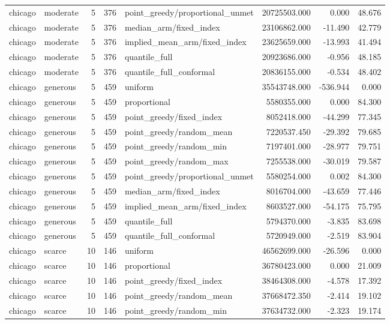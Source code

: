 \begin{tabular}{llrrlrrr}
chicago & moderate & 5 & 376 & point\_greedy/proportional\_unmet & 20725503.000 & 0.000 & 48.676 \\
chicago & moderate & 5 & 376 & median\_arm/fixed\_index & 23106862.000 & -11.490 & 42.779 \\
chicago & moderate & 5 & 376 & implied\_mean\_arm/fixed\_index & 23625659.000 & -13.993 & 41.494 \\
chicago & moderate & 5 & 376 & quantile\_full & 20923686.000 & -0.956 & 48.185 \\
chicago & moderate & 5 & 376 & quantile\_full\_conformal & 20836155.000 & -0.534 & 48.402 \\
chicago & generous & 5 & 459 & uniform & 35543748.000 & -536.944 & 0.000 \\
chicago & generous & 5 & 459 & proportional & 5580355.000 & 0.000 & 84.300 \\
chicago & generous & 5 & 459 & point\_greedy/fixed\_index & 8052418.000 & -44.299 & 77.345 \\
chicago & generous & 5 & 459 & point\_greedy/random\_mean & 7220537.450 & -29.392 & 79.685 \\
chicago & generous & 5 & 459 & point\_greedy/random\_min & 7197401.000 & -28.977 & 79.751 \\
chicago & generous & 5 & 459 & point\_greedy/random\_max & 7255538.000 & -30.019 & 79.587 \\
chicago & generous & 5 & 459 & point\_greedy/proportional\_unmet & 5580254.000 & 0.002 & 84.300 \\
chicago & generous & 5 & 459 & median\_arm/fixed\_index & 8016704.000 & -43.659 & 77.446 \\
chicago & generous & 5 & 459 & implied\_mean\_arm/fixed\_index & 8603527.000 & -54.175 & 75.795 \\
chicago & generous & 5 & 459 & quantile\_full & 5794370.000 & -3.835 & 83.698 \\
chicago & generous & 5 & 459 & quantile\_full\_conformal & 5720949.000 & -2.519 & 83.904 \\
chicago & scarce & 10 & 146 & uniform & 46562699.000 & -26.596 & 0.000 \\
chicago & scarce & 10 & 146 & proportional & 36780423.000 & 0.000 & 21.009 \\
chicago & scarce & 10 & 146 & point\_greedy/fixed\_index & 38464308.000 & -4.578 & 17.392 \\
chicago & scarce & 10 & 146 & point\_greedy/random\_mean & 37668472.350 & -2.414 & 19.102 \\
chicago & scarce & 10 & 146 & point\_greedy/random\_min & 37634732.000 & -2.323 & 19.174 \\

\end{tabular}
